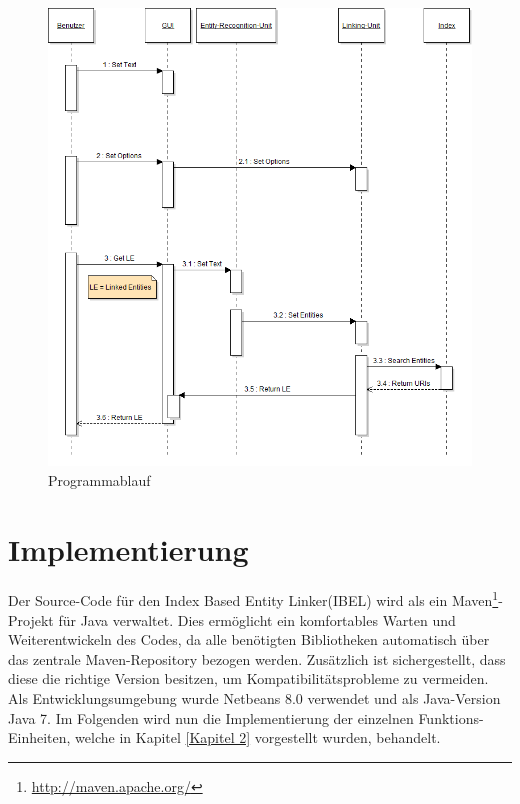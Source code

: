 \documentclass[11pt, a4paper, oneside]{Thesis} %
\begin{document}
\begin{figure}[ht!]
\centering
\includegraphics[scale=0.55]{./seq.png}
\caption[Programmablauf]{Programmablauf}
\end{figure}
\chapter{Implementierung}
\label{Kapitel 3}
Der Source-Code f\"ur den Index Based Entity Linker(IBEL) wird als ein  Maven\footnote{\url{http://maven.apache.org/}}-Projekt f\"ur Java verwaltet. Dies erm\"oglicht ein komfortables Warten und Weiterentwickeln des Codes, da alle ben\"otigten Bibliotheken automatisch \"uber das zentrale Maven-Repository bezogen werden. Zus\"atzlich ist sichergestellt, dass diese die richtige Version besitzen, um Kompatibilitätsprobleme zu vermeiden.\\
Als Entwicklungsumgebung wurde Netbeans 8.0 verwendet und als Java-Version Java 7. 
Im Folgenden wird nun die Implementierung der einzelnen Funktions-Einheiten, welche in Kapitel \ref{Kapitel 2} vorgestellt wurden, behandelt.
\end{document}
